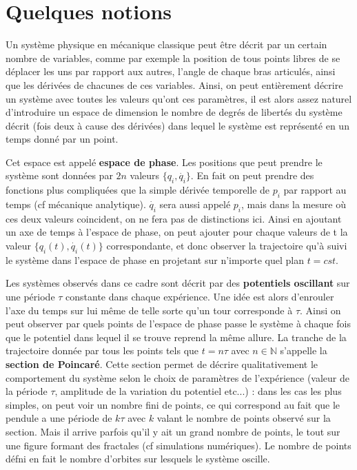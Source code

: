 \documentclass[a4paper,12pt,oneside]{article}
\begin{document}
\section{Quelques notions}
\label{Quelques notions}

Un système physique en mécanique classique peut être décrit par un certain nombre de variables, comme par exemple la position de tous points libres de se déplacer les uns par rapport aux autres, l'angle de chaque bras articulés, ainsi que les dérivées de chacunes de ces variables. Ainsi, on peut entièrement décrire un système avec toutes les valeurs qu'ont ces paramètres, il est alors assez naturel d'introduire un espace de dimension le nombre de degrés de libertés du système décrit (fois deux à cause des dérivées) dans lequel le système est représenté en un temps donné par un point.

Cet espace est appelé \textbf{espace de phase}. Les positions que peut prendre le système sont données par $2n$ valeurs $\{q_i,\dot{q_i}\}$. En fait on peut prendre des fonctions plus compliquées que la simple dérivée temporelle de $p_i$ par rapport au temps (cf mécanique analytique). $\dot{q_i}$ sera aussi appelé $p_i$, mais dans la mesure où ces deux valeurs coincident, on ne fera pas de distinctions ici.
Ainsi en ajoutant un axe de temps à l'espace de phase, on peut ajouter pour chaque valeurs de t la valeur $\{q_i(t),\dot{q_i}(t)\}$ correspondante, et donc observer la trajectoire qu'à suivi le système dans l'espace de phase en projetant sur n'importe quel plan $t=cst$.

Les systèmes observés dans ce cadre sont décrit par des \textbf{potentiels oscillant} sur une période $\tau$ constante dans chaque expérience. Une idée est alors d'enrouler l'axe du temps sur lui même de telle sorte qu'un tour corresponde à $\tau$. Ainsi on peut observer par quels points de l'espace de phase passe le système à chaque fois que le potentiel dans lequel il se trouve reprend la même allure. La tranche de la trajectoire donnée par tous les points tels que $t=n\tau$ avec $n\in \mathbb{N}$ s'appelle la \textbf{section de Poincaré}. Cette section permet de décrire qualitativement le comportement du système selon le choix de paramètres de l'expérience (valeur de la période $\tau$, amplitude de la variation du potentiel etc...) : dans les cas les plus simples, on peut voir un nombre fini de points, ce qui correspond au fait que le pendule a une période de $k\tau$ avec $k$ valant le nombre de points observé sur la section. Mais il arrive parfois qu'il y ait un grand nombre de points, le tout sur une figure formant des fractales (cf simulations numériques). Le nombre de points défni en fait le nombre d'orbites sur lesquels le système oscille.
\end{document}
